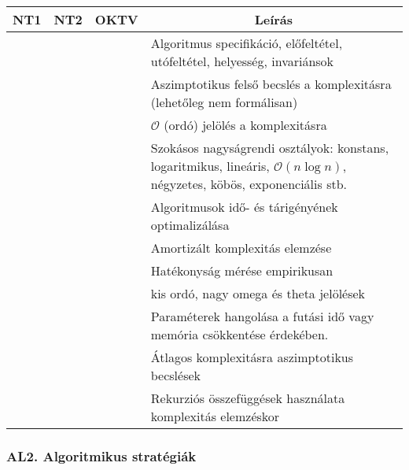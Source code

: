 \documentclass[a4paper,11pt,oneside]{article}
\newcommand{\cmark}{\ding{51}}%
\newcommand{\xmark}{\ding{55}}%
\newcommand{\cdefi}{{\small\cmark\faFileTextO}}
\newcommand{\ccode}{{\small\cmark\faFileText}}
\newcommand{\cnfoc}{{\small\faQuestion}}
\newcommand{\cexcl}{{\small\xmark}}
\newcommand{\ctable}[1]{
    \begin{center}
        \begin{longtable}{ | C | C | C | m{8cm} | } %
        \hline
        \textbf{NT1} & \textbf{NT2} & \textbf{OKTV} & \multicolumn{1}{|c|}{\textbf{Leírás}} \\ \hline
        \endhead
        #1
        \end{longtable}
    \end{center}
}
\begin{document}
\ctable {
    \cdefi & \cdefi & \cdefi & Algoritmus specifikáció, előfeltétel, utófeltétel, helyesség, invariánsok
    \\ \hline %
    \ccode & \ccode & \ccode & Aszimptotikus felső becslés a komplexitásra (lehetőleg nem formálisan)
    \\ \hline %
    \cexcl & \ccode & \cdefi & $\mathcal{O}$ (ordó) jelölés a komplexitásra
    \\ \hline %
    \ccode & \ccode & \ccode & Szokásos nagyságrendi osztályok: konstans, logaritmikus, lineáris, $\mathcal{O}(n \log n)$, négyzetes, köbös, exponenciális stb.
    \\ \hline %
    \ccode & \ccode & \ccode & Algoritmusok idő- és tárigényének optimalizálása
    \\ \hline %
    \cexcl & \ccode & \ccode & Amortizált komplexitás elemzése
    \\ \hline %
    \ccode & \ccode & \ccode & Hatékonyság mérése empirikusan
    \\ \hline %
    \cnfoc & \cnfoc & \cnfoc & kis ordó, nagy omega és theta jelölések %
    \\ \hline %
    \cnfoc & \cnfoc & \cnfoc & Paraméterek hangolása a futási idő vagy memória csökkentése érdekében.
    \\ \hline %
    \cexcl & \cexcl & \cexcl & Átlagos komplexitásra aszimptotikus becslések
    \\ \hline %
    \cexcl & \cexcl & \cexcl & Rekurziós összefüggések használata komplexitás elemzéskor
    \\ \hline %
}

\subsubsection*{AL2. Algoritmikus stratégiák} %
\end{document}
